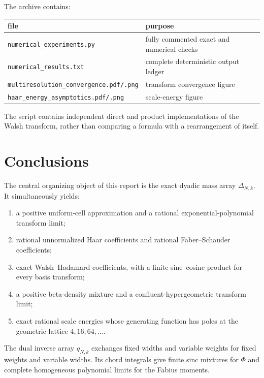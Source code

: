 \documentclass[11pt,oneside]{article}
\theoremstyle{definition}
\theoremstyle{remark}
\begin{document}
The archive contains:
\begin{center}
\begin{tabular}{@{}ll@{}}
\toprule
file & purpose\\
\midrule
\texttt{numerical\_experiments.py} & fully commented exact and numerical checks\\
\texttt{numerical\_results.txt} & complete deterministic output ledger\\
\texttt{multiresolution\_convergence.pdf/.png} & transform convergence figure\\
\texttt{haar\_energy\_asymptotics.pdf/.png} & scale-energy figure\\
\bottomrule
\end{tabular}
\end{center}
The script contains independent direct and product implementations of the
Walsh transform, rather than comparing a formula with a rearrangement of
itself.

\section{Conclusions}
\label{sec:conclusions}

The central organizing object of this report is the exact dyadic mass array
$\Delta_{N,k}$.  It simultaneously yields:
\begin{enumerate}
\item a positive uniform-cell approximation and a rational exponential-polynomial
      transform limit;
\item rational unnormalized Haar coefficients and rational Faber--Schauder
      coefficients;
\item exact Walsh--Hadamard coefficients, with a finite sine--cosine product for
      every basis transform;
\item a positive beta-density mixture and a confluent-hypergeometric transform
      limit;
\item exact rational scale energies whose generating function has poles at the
      geometric lattice $4,16,64,\ldots$.
\end{enumerate}
The dual inverse array $q_{N,k}$ exchanges fixed widths and variable weights for
fixed weights and variable widths.  Its chord integrals give finite sinc
mixtures for $\Phi$ and complete homogeneous polynomial limits for the Fabius
moments.
\end{document}
